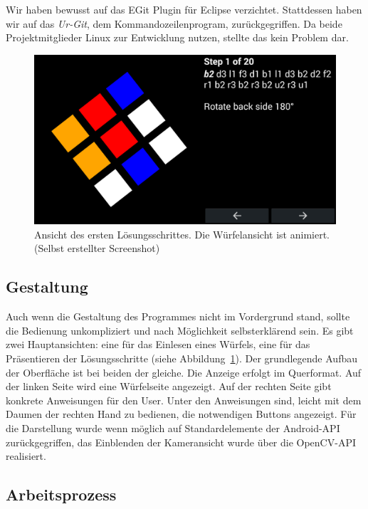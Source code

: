 Wir haben bewusst auf das EGit Plugin für Eclipse verzichtet. Stattdessen haben
wir auf das \emph{Ur-Git}, dem Kommandozeilenprogram, zurückgegriffen. Da beide
Projektmitglieder Linux zur Entwicklung nutzen, stellte das kein Problem dar.


\begin{figure}[ht!]
  \centering
  \includegraphics[width=\textwidth]{pics/arcs_solving.png}
  \caption{Ansicht des ersten Lösungsschrittes. Die Würfelansicht ist animiert.
  (Selbst erstellter Screenshot)}
  \label{fig:arcs_solving}
\end{figure}


\subsection{Gestaltung}  %

Auch wenn die Gestaltung des Programmes nicht im Vordergrund stand, sollte die
Bedienung unkompliziert und nach Möglichkeit selbsterklärend sein. Es gibt zwei
Hauptansichten: eine für das Einlesen eines Würfels, eine für das Präsentieren
der Lösungsschritte (siehe Abbildung~\ref{fig:arcs_solving}). Der grundlegende
Aufbau der Oberfläche ist bei beiden der gleiche. Die Anzeige erfolgt im
Querformat. Auf der linken Seite wird eine Würfelseite angezeigt. Auf der
rechten Seite gibt konkrete Anweisungen für den User. Unter den Anweisungen
sind, leicht mit dem Daumen der rechten Hand zu bedienen, die notwendigen
Buttons angezeigt. Für die Darstellung wurde wenn möglich auf Standardelemente
der Android-API zurückgegriffen, das Einblenden der Kameransicht wurde über die
OpenCV-API realisiert.

\subsection{Arbeitsprozess}  %

